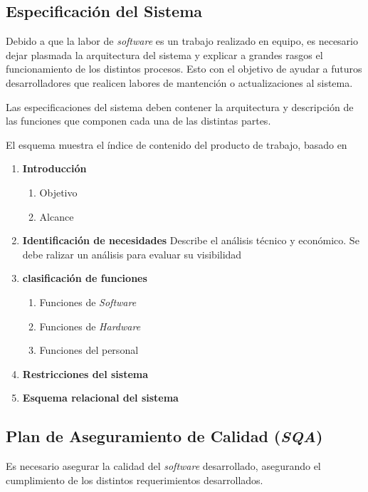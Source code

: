 \subsection{Especificación del Sistema}

Debido a que la labor de \emph{software} es un trabajo realizado en equipo, es necesario dejar plasmada la arquitectura del sistema y explicar a grandes rasgos el funcionamiento de los distintos procesos. Esto con el objetivo de ayudar a futuros desarrolladores que realicen labores de mantención o actualizaciones al sistema.

Las especificaciones del sistema deben contener la arquitectura y descripción de las funciones que componen cada una de las distintas partes.

El esquema muestra el índice de contenido del producto de trabajo, basado en \citep{mem00}

\begin{framed}
     \begin{enumerate}
		\item \textbf{Introducción}
		\begin{enumerate}
			\item Objetivo
			\item Alcance 
		\end{enumerate}
		\item \textbf{Identificación de necesidades}
		Describe el análisis técnico y económico. Se debe ralizar un análisis para evaluar su visibilidad	
		\item \textbf{clasificación de funciones}
		\begin{enumerate}
			\item Funciones de \emph{Software}
			\item Funciones de \emph{Hardware}
			\item Funciones del personal
		\end{enumerate}		
		\item \textbf{Restricciones del sistema}
		\item \textbf{Esquema relacional del sistema}
	\end{enumerate}
\end{framed}

\subsection{Plan de Aseguramiento de Calidad (\emph{SQA})}
Es necesario asegurar la calidad del \emph{software} desarrollado, asegurando el cumplimiento de los distintos requerimientos desarrollados.

